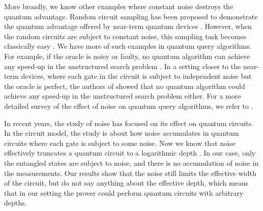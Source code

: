 \documentclass[11pt]{article}
\theoremstyle{plain}
\theoremstyle{definition}
\newcommand{\1}{\mathbb{1}} %
\begin{document}
More broadly, we know other examples where constant noise destroys the quantum advantage.
Random circuit sampling has been proposed to demonstrate the quantum advantage offered by near-term quantum devices \cite{boixo2018characterizing}.
However, when the random circuits are subject to constant noise, this sampling task becomes classically easy \cite{aharonov2023polynomial}.
We have more of such examples in quantum query algorithms. For example, if the oracle is noisy or faulty, no
quantum algorithm can achieve any speed-up in the unstructured search problem \cite{regev2008impossibility}.
In a setting closer to the near-term devices, where each gate in the circuit is subject to independent noise but the oracle is perfect,
the authors of \cite{chen2022complexity} showed that no quantum algorithm could achieve any speed-up in the unstructured search problem either.
For a more detailed survey of the effect of noise on quantum query algorithms, we refer to \cite[Section 3]{chen2022complexity}.

In recent years, the study of noise has focused on its effect on quantum circuits. In the circuit model, the study is about how noise accumulates in quantum circuits where each gate is subject to some noise. Now we know that noise effectively truncates a quantum circuit to a logarithmic depth \cite{mele2024noise}.
In our case, only the entangled states are subject to noise, and there is no accumulation of noise in the measurements. Our results show that the noise still limits the effective width of the circuit, but do not say anything about the effective depth, which means
that in our setting the prover could perform quantum circuits with arbitrary depths.
\end{document}
